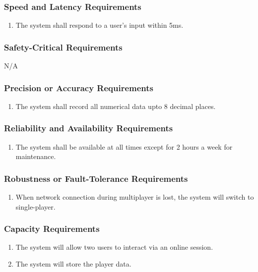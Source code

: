 \documentclass[]{article}
\begin{document}
\subsubsection{Speed and Latency Requirements}
\label{ssub:speed_and_latency_requirements}
\begin{enumerate}[start=1, label={PR\arabic*.}]
	\item The system shall respond to a user’s input within 5ms.
\end{enumerate}

\subsubsection{Safety-Critical Requirements}
\label{ssub:safety_critical_requirements}
N/A

\subsubsection{Precision or Accuracy Requirements}
\label{ssub:precision_or_accuracy_requirements}
\begin{enumerate}[start=2, label={PR\arabic*.}]
	\item The system shall record all numerical data upto 8 decimal places.
\end{enumerate}

\subsubsection{Reliability and Availability Requirements}
\label{ssub:reliability_and_availability_requirements}
\begin{enumerate}[start=3, label={PR\arabic*.}]
    \item The system shall be available at all times except for 2 hours a week 
    for maintenance.
\end{enumerate}

\subsubsection{Robustness or Fault-Tolerance Requirements}
\label{ssub:robustness_or_fault_tolerance_requirements}
\begin{enumerate}[start=4, label={PR\arabic*.}]
    \item When network connection during multiplayer is lost, the system will 
    switch to single-player.
\end{enumerate}

\subsubsection{Capacity Requirements}
\label{ssub:capacity_requirements}
\begin{enumerate}[start=5, label={PR\arabic*.}]
	\item The system will allow two users to interact via an online session.
	\item The system will store the player data.
\end{enumerate}
\end{document}

